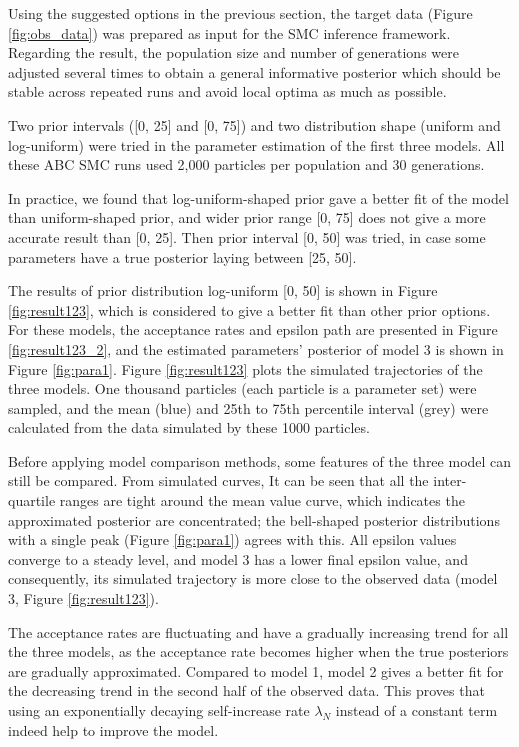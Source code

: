 Using the suggested options in the previous section, the target data (Figure \ref{fig:obs_data}) was prepared as input for the SMC inference framework. Regarding the result, the population size and number of generations were adjusted several times to obtain a general informative posterior which should be stable across repeated runs and avoid local optima as much as possible.

Two prior intervals ([0, 25] and [0, 75]) and two distribution shape (uniform and log-uniform) were tried in the parameter estimation of the first three models. All these ABC SMC runs used 2,000 particles per population and 30 generations.

In practice, we found that log-uniform-shaped prior gave a better fit of the model than uniform-shaped prior, and wider prior range [0, 75] does not give a more accurate result than [0, 25]. Then prior interval [0, 50] was tried, in case some parameters have a true posterior laying between [25, 50].

The results of prior distribution log-uniform [0, 50] is shown in Figure \ref{fig:result123}, which is considered to give a better fit than other prior options. For these models, the acceptance rates and epsilon path are presented in Figure \ref{fig:result123_2}, and the estimated parameters' posterior of model 3 is shown in Figure \ref{fig:para1}. Figure \ref{fig:result123} plots the simulated trajectories of the three models. One thousand particles (each particle is a parameter set) were sampled, and the mean (blue) and 25th to 75th percentile interval (grey) were calculated from the data simulated by these 1000 particles.

Before applying model comparison methods, some features of the three model can still be compared. From simulated curves, It can be seen that all the inter-quartile ranges are tight around the mean value curve, which indicates the approximated posterior are concentrated; the bell-shaped posterior distributions with a single peak (Figure \ref{fig:para1}) agrees with this. All epsilon values converge to a steady level, and model 3 has a lower final epsilon value, and consequently, its simulated trajectory is more close to the observed data (model 3, Figure \ref{fig:result123}).

The acceptance rates are fluctuating and have a gradually increasing trend for all the three models, as the acceptance rate becomes higher when the true posteriors are gradually approximated. Compared to model 1, model 2 gives a better fit for the decreasing trend in the second half of the observed data. This proves that using an exponentially decaying self-increase rate $\lambda_N$ instead of a constant term indeed help to improve the model.

